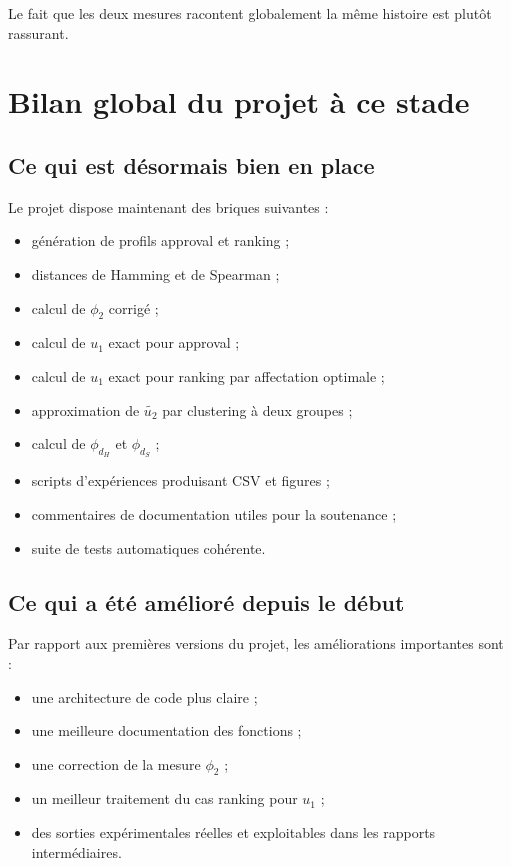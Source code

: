 \documentclass[11pt,a4paper]{article}
\begin{document}
Le fait que les deux mesures racontent globalement la m\^eme histoire est plut\^ot rassurant.

\section{Bilan global du projet \`a ce stade}

\subsection{Ce qui est d\'esormais bien en place}

Le projet dispose maintenant des briques suivantes :
\begin{itemize}[leftmargin=*]
    \item g\'en\'eration de profils approval et ranking ;
    \item distances de Hamming et de Spearman ;
    \item calcul de \(\phi_2\) corrig\'e ;
    \item calcul de \(u_1\) exact pour approval ;
    \item calcul de \(u_1\) exact pour ranking par affectation optimale ;
    \item approximation de \(\widetilde{u_2}\) par clustering \`a deux groupes ;
    \item calcul de \(\phi_{d_H}\) et \(\phi_{d_S}\) ;
    \item scripts d'exp\'eriences produisant CSV et figures ;
    \item commentaires de documentation utiles pour la soutenance ;
    \item suite de tests automatiques coh\'erente.
\end{itemize}

\subsection{Ce qui a \'et\'e am\'elior\'e depuis le d\'ebut}

Par rapport aux premi\`eres versions du projet, les am\'eliorations importantes sont :
\begin{itemize}[leftmargin=*]
    \item une architecture de code plus claire ;
    \item une meilleure documentation des fonctions ;
    \item une correction de la mesure \(\phi_2\) ;
    \item un meilleur traitement du cas ranking pour \(u_1\) ;
    \item des sorties exp\'erimentales r\'eelles et exploitables dans les rapports interm\'ediaires.
\end{itemize}
\end{document}
